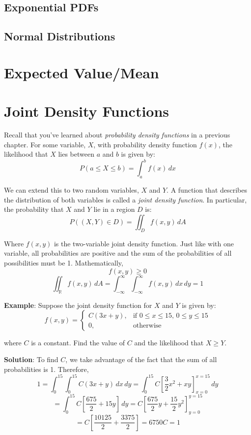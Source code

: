 \subsection{Exponential PDFs}

\subsection{Normal Distributions}

\section{Expected Value/Mean}

\section{Joint Density Functions}
Recall that you've learned about \textit{probability density functions} in a 
previous chapter. For some variable, $X$, with probability density function 
$f(x)$, the likelihood that $X$ lies between $a$ and $b$ is given by:
$$P(a \leq X \leq b) = \int_a^b f(x)\,dx$$

We can extend this to two random variables, $X$ and $Y$. A function that 
describes the distribution of both variables is called a \textit{joint 
density function}. In particular, the probability
that $X$ and $Y$ lie in a region $D$ is:
$$P((X, Y) \in D) = \iint_{\textit{D}} f(x,y)\,dA$$

Where $f(x, y)$ is the two-variable joint density function. Just like with one 
variable, all probabilities are positive and the sum of the probabilities of 
all possibilities must be 1. Mathematically, 
$$f(x, y) \geq 0$$
$$\iint_{\mathbb{R}} f(x, y)\,dA = \int_{-\infty}^{\infty} \int_{-\infty}^{
\infty} f(x, y)\,dx\,dy = 1$$

\textbf{Example}: Suppose the joint density function for $X$ and $Y$ is given 
by:
$$f(x, y) = 
\begin{cases}
C(3x + y),& \text{if }0 \leq x \leq 15\text{, }0 \leq y \leq 15\\
0,&\text{otherwise}
\end{cases}
$$

where $C$ is a constant. Find the value of $C$ and the likelihood that $X \geq 
Y$.

\textbf{Solution}: To find $C$, we take advantage of the fact that the sum of 
all probabilities is 1. Therefore,
$$1 = \int_0^{15} \int_0^{15} C(3x + y)\,dx\,dy = \int_0^{15} C \left[ \frac{3
}{2}x^2 + xy \right]_{x = 0}^{x = 15}\,dy$$
$$= \int_0^{15} C \left[ \frac{675}{2} + 15y \right]\,dy = C \left[ \frac{675}{
2}y + \frac{15}{2}y^2 \right]_{y = 0}^{y = 15}$$
$$= C \left[ \frac{10125}{2} + \frac{3375}{2} \right] = 6750C = 1$$

